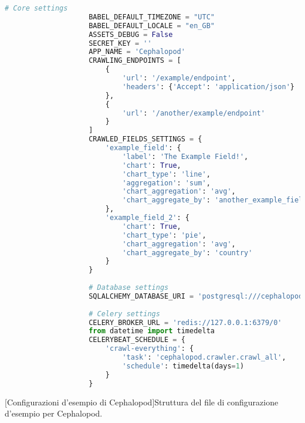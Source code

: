             \begin{center}
                \begin{lstlisting}[language=python, gobble=18]
                    # Core settings
                    BABEL_DEFAULT_TIMEZONE = "UTC"
                    BABEL_DEFAULT_LOCALE = "en_GB"
                    ASSETS_DEBUG = False
                    SECRET_KEY = ''
                    APP_NAME = 'Cephalopod'
                    CRAWLING_ENDPOINTS = [
                        {
                            'url': '/example/endpoint',
                            'headers': {'Accept': 'application/json'}
                        },
                        {
                            'url': '/another/example/endpoint'
                        }
                    ]
                    CRAWLED_FIELDS_SETTINGS = {
                        'example_field': {
                            'label': 'The Example Field!',
                            'chart': True,
                            'chart_type': 'line',
                            'aggregation': 'sum',
                            'chart_aggregation': 'avg',
                            'chart_aggregate_by': 'another_example_field'
                        },
                        'example_field_2': {
                            'chart': True,
                            'chart_type': 'pie',
                            'chart_aggregation': 'avg',
                            'chart_aggregate_by': 'country'
                        }
                    }
                    
                    # Database settings
                    SQLALCHEMY_DATABASE_URI = 'postgresql:///cephalopod'
                    
                    # Celery settings
                    CELERY_BROKER_URL = 'redis://127.0.0.1:6379/0'
                    from datetime import timedelta
                    CELERYBEAT_SCHEDULE = {
                        'crawl-everything': {
                            'task': 'cephalopod.crawler.crawl_all',
                            'schedule': timedelta(days=1)
                        }
                    }
                \end{lstlisting}
                \captionsetup{textformat=empty,labelformat=empty} \vspace{-2em}
                [Configurazioni d'esempio di Cephalopod]{Struttura del file di configurazione d'esempio per Cephalopod.}
            \end{center}
            
